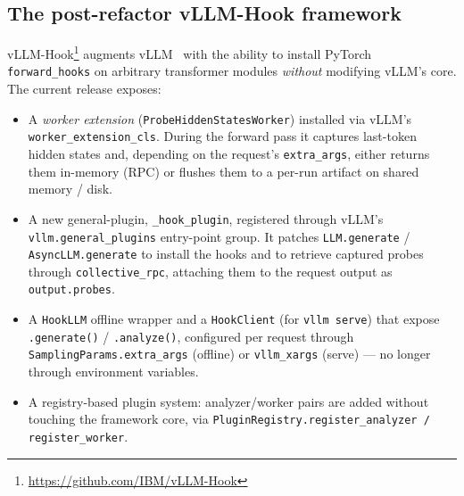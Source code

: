 \documentclass[11pt]{article}
\begin{document}
\subsection{The post-refactor vLLM-Hook framework}
vLLM-Hook\footnote{\url{https://github.com/IBM/vLLM-Hook}} augments
vLLM~\cite{vllm} with the ability to install PyTorch \texttt{forward\_hooks} on arbitrary
transformer modules \emph{without} modifying vLLM's core. The current release exposes:
\begin{itemize}
  \item A \emph{worker extension} (\texttt{ProbeHiddenStatesWorker}) installed via vLLM's
  \texttt{worker\_extension\_cls}. During the forward pass it captures last-token hidden
  states and, depending on the request's \texttt{extra\_args}, either returns them in-memory
  (RPC) or flushes them to a per-run artifact on shared memory / disk.
  \item A new general-plugin, \texttt{\_hook\_plugin}, registered through vLLM's
  \texttt{vllm.general\_plugins} entry-point group. It patches \texttt{LLM.generate} /
  \texttt{AsyncLLM.generate} to install the hooks and to retrieve captured probes through
  \texttt{collective\_rpc}, attaching them to the request output as \texttt{output.probes}.
  \item A \texttt{HookLLM} offline wrapper and a \texttt{HookClient} (for \texttt{vllm serve})
  that expose \texttt{.generate()} / \texttt{.analyze()}, configured per request through
  \texttt{SamplingParams.extra\_args} (offline) or \texttt{vllm\_xargs} (serve) --- no longer
  through environment variables.
  \item A registry-based plugin system: analyzer/worker pairs are added without touching the
  framework core, via \texttt{PluginRegistry.register\_analyzer / register\_worker}.
\end{itemize}
\end{document}
